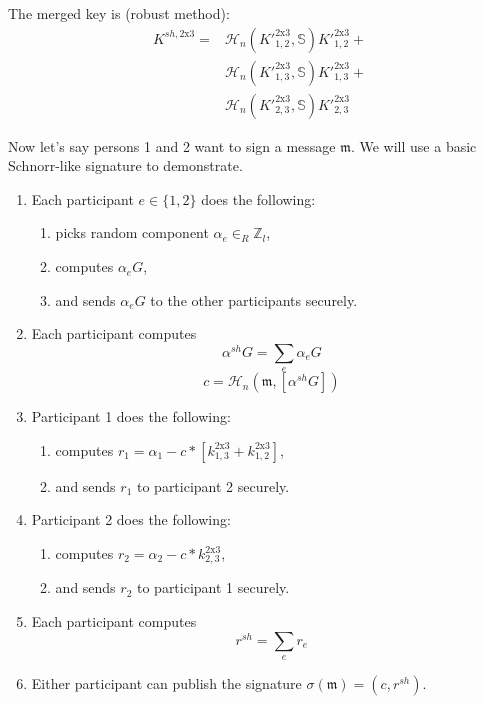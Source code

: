 The merged key is (robust method):
\begin{align*}
    K^{sh,\textrm{2x3}} = &\mathcal{H}_n(K'^{\textrm{2x3}}_{1,2},\mathbb{S}) K'^{\textrm{2x3}}_{1,2} + \\
                          &\mathcal{H}_n(K'^{\textrm{2x3}}_{1,3},\mathbb{S}) K'^{\textrm{2x3}}_{1,3} + \\
                          &\mathcal{H}_n(K'^{\textrm{2x3}}_{2,3},\mathbb{S}) K'^{\textrm{2x3}}_{2,3}
\end{align*}

Now let's say persons 1 and 2 want to sign a message $\mathfrak{m}$. We will use a basic Schnorr-like signature to demonstrate.

\begin{enumerate}
    \item Each participant $e \in \{1,2\}$ does the following:
    \begin{enumerate}
        \item picks random component $\alpha_e \in_R \mathbb{Z}_l$,
        \item computes $\alpha_e G$,
        \item and sends $\alpha_e G$ to the other participants securely.
    \end{enumerate}
    \item Each participant computes 
    \[ \alpha^{sh} G = \sum_e \alpha_e G \]
    \[ c = \mathcal{H}_n(\mathfrak{m},[\alpha^{sh} G]) \]
    \item Participant 1 does the following:
    \begin{enumerate}
        \item computes $r_1 = \alpha_1 - c*[k^{\textrm{2x3}}_{1,3} + k^{\textrm{2x3}}_{1,2}]$,
        \item and sends $r_1$ to participant 2 securely.
    \end{enumerate}
    \item Participant 2 does the following:
    \begin{enumerate}
        \item computes $r_2 = \alpha_2 - c*k^{\textrm{2x3}}_{2,3}$,
        \item and sends $r_2$ to participant 1 securely.
    \end{enumerate}
    \item Each participant computes 
    \[ r^{sh} = \sum_e r_e \]
    \item Either participant can publish the signature $\sigma(\mathfrak{m}) = (c,r^{sh})$.
\end{enumerate}

